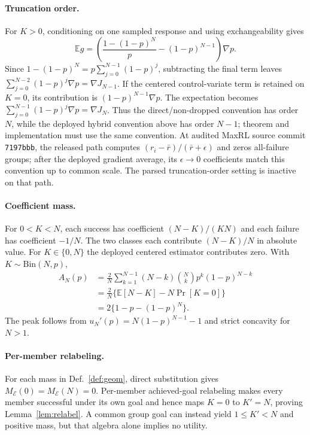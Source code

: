 \paragraph{Truncation order.}
For $K>0$, conditioning on one sampled response and using exchangeability
gives
\[
\mathbb E\hat g
=\left(\frac{1-(1-p)^N}{p}-(1-p)^{N-1}\right)\nabla p.
\]
Since $1-(1-p)^N=p\sum_{j=0}^{N-1}(1-p)^j$, subtracting the final term
leaves
$\sum_{j=0}^{N-2}(1-p)^j\nabla p=\nabla J_{N-1}$.
If the centered control-variate term is retained on $K=0$, its contribution is
$(1-p)^{N-1}\nabla p$. The expectation becomes
$\sum_{j=0}^{N-1}(1-p)^j\nabla p=\nabla J_N$. Thus the direct/non-dropped
convention has order $N$, while the deployed hybrid convention above has order
$N-1$; theorem and implementation must use the same convention.
At audited MaxRL source commit \texttt{7197bbb}, the released path computes
$(r_i-\bar r)/(\bar r+\epsilon)$ and zeros all-failure groups; after the
deployed gradient average, its $\epsilon\to0$ coefficients match this
convention up to common scale. The parsed truncation-order setting is inactive
on that path.

\paragraph{Coefficient mass.}
For $0<K<N$, each success has coefficient $(N-K)/(KN)$ and each failure
has coefficient $-1/N$. The two classes each contribute $(N-K)/N$ in
absolute value. For $K\in\{0,N\}$ the deployed centered estimator
contributes zero. With $K\sim\mathrm{Bin}(N,p)$,
\[
\begin{aligned}
A_N(p)
&=\frac{2}{N}\sum_{k=1}^{N-1}(N-k)
  \binom{N}{k}p^k(1-p)^{N-k}\\
&=\frac{2}{N}\{\mathbb E[N-K]-N\Pr[K=0]\}\\
&=2\{1-p-(1-p)^N\}.
\end{aligned}
\]
The peak follows from $u_N'(p)=N(1-p)^{N-1}-1$ and strict concavity for
$N>1$.

\paragraph{Per-member relabeling.}
For each mass in Def.~\ref{def:geom}, direct substitution gives
$M_{\mathcal E}(0)=M_{\mathcal E}(N)=0$. Per-member achieved-goal relabeling
makes every member successful under its own goal and hence maps $K=0$ to
$K'=N$, proving Lemma~\ref{lem:relabel}. A common group goal can instead yield
$1\le K'<N$ and positive mass, but that algebra alone implies no utility.

